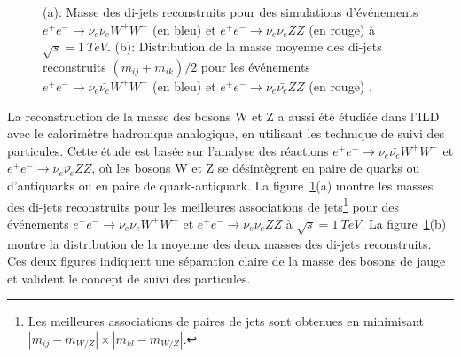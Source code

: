 \begin{figure}[!ht]
  \caption{(a): Masse des di-jets reconstruits pour des simulations d'événements $e^+e^-\rightarrow\nu_e\bar{\nu_e}W^+W^-$ (en bleu) et $e^+e^-\rightarrow\nu_e\bar{\nu_e}ZZ$ (en rouge) à $\sqrt{s}=1~TeV$. (b): Distribution de la masse moyenne des di-jets reconstruits $(m_{ij}+m_{ik})/2$ pour les événements $e^+e^-\rightarrow\nu_e\bar{\nu_e}W^+W^-$ (en bleu) et $e^+e^-\rightarrow\nu_e\bar{\nu_e}ZZ$ (en rouge) \cite{detectorTDR}.}
  \label{fig:ww-zz-ahcal}
\end{figure}
La reconstruction de la masse des bosons W et Z a aussi été étudiée dans l'ILD avec le calorimètre hadronique analogique, en utilisant les technique de suivi des particules. Cette étude est basée sur l'analyse des réactions $e^+e^-\rightarrow\nu_e\bar{\nu_e}W^+W^-$ et $e^+e^-\rightarrow\nu_e\bar{\nu_e}ZZ$, où les bosons W et Z se désintègrent en paire de quarks ou d'antiquarks ou en paire de quark-antiquark. La figure~\ref{fig:ww-zz-ahcal}(a) montre les masses des di-jets reconstruits pour les meilleures associations de jets\footnote{Les meilleures associations de paires de jets sont obtenues en minimisant $|m_{ij}-m_{W/Z}|\times|m_{kl}-m_{W/Z}|$.} pour des événements $e^+e^-\rightarrow\nu_e\bar{\nu_e}W^+W^-$ et $e^+e^-\rightarrow\nu_e\bar{\nu_e}ZZ$ à $\sqrt{s}=1~TeV$. La figure~\ref{fig:ww-zz-ahcal}(b) montre la distribution de la moyenne des deux masses des di-jets reconstruits. Ces deux figures indiquent une séparation claire de la masse des bosons de jauge et valident le concept de suivi des particules.

